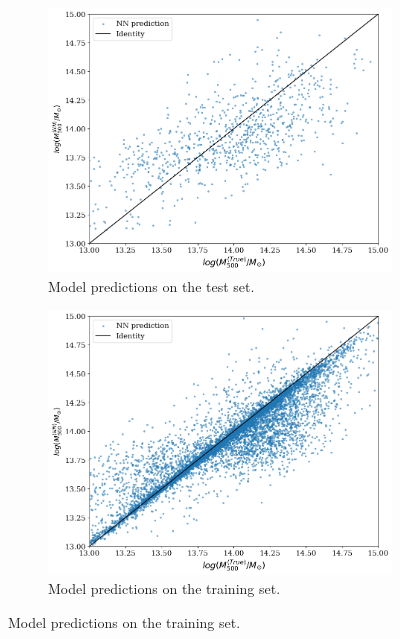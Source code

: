 \begin{figure}[H]
\centering
\begin{subfigure}{.46\textwidth}
  \centering
  \includegraphics[width=\linewidth]{images/Chapter4/ResNet50/res50_best_test.png}
  \caption{Model predictions on the test set.}
  \label{fig:best_perf_resnet50_a}
\end{subfigure}%
\hspace{.6em}
\begin{subfigure}{.46\textwidth}
  \centering
  \includegraphics[width=\linewidth]{images/Chapter4/ResNet50/res50_best_train.png}
  \caption{Model predictions on the training set.}
  \label{fig:best_perf_resnet50_b}
\end{subfigure}

\end{figure}

